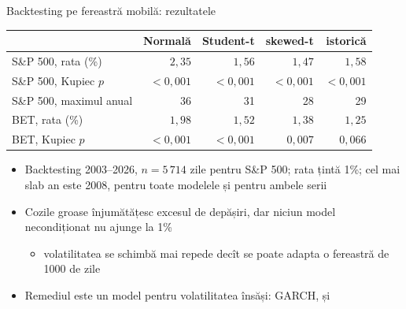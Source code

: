 \begin{frame}{Backtesting pe fereastră mobilă: rezultatele}
\itemsize{\footnotesize}
\begin{center}
\footnotesize
\begin{tabular}{lrrrr}
\toprule
& Normală & Student-t & skewed-t & istorică \\
\midrule
S\&P 500, rata (\%) & $2{,}35$ & $1{,}56$ & $1{,}47$ & $1{,}58$ \\
S\&P 500, Kupiec $p$ & $<0{,}001$ & $<0{,}001$ & $<0{,}001$ & $<0{,}001$ \\
S\&P 500, maximul anual & 36 & 31 & 28 & 29 \\
BET, rata (\%) & $1{,}98$ & $1{,}52$ & $1{,}38$ & $1{,}25$ \\
BET, Kupiec $p$ & $<0{,}001$ & $<0{,}001$ & $0{,}007$ & $0{,}066$ \\
\bottomrule
\end{tabular}
\end{center}
\begin{itemize}
    \item Backtesting 2003--2026, $n = 5\,714$ zile pentru S\&P 500; rata țintă 1\%; cel mai slab an este 2008, pentru toate modelele și pentru ambele serii
    \item Cozile groase înjumătățesc excesul de depășiri, dar niciun model necondiționat nu ajunge la 1\%
    \begin{itemize}
        \item volatilitatea se schimbă mai repede decît se poate adapta o fereastră de 1000 de zile
    \end{itemize}
    \item Remediul este un model pentru volatilitatea însăși: GARCH,  și 
\end{itemize}
\end{frame}

